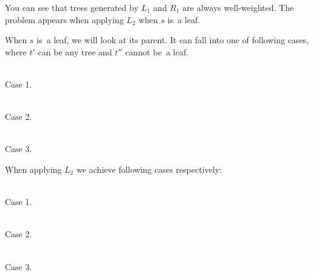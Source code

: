 \documentclass[final]{article}
\theoremstyle{definition}
\theoremstyle{definition}
\theoremstyle{remark}
\begin{document}
You can see that trees generated by \(L_1\) and \(R_1\) are always well-weighted. The problem appears when applying \(L_2\) when \(s\) is~a leaf.

When \(s\) is~a leaf, we will look at its parent. It can fall into one of following cases, where \(t'\) can be any tree and \(t''\) cannot be~a leaf.

\begin{center}
    \begin{minipage}[t]{.3\textwidth}
        \begin{center}
            \\
            Case 1.
        \end{center}
    \end{minipage}%
    \begin{minipage}[t]{.3\textwidth}
        \begin{center}
            \\
            Case 2.
        \end{center}
    \end{minipage}%
    \begin{minipage}[t]{.3\textwidth}
        \begin{center}
            \\
            Case 3.
        \end{center}
    \end{minipage}%
\end{center}

When applying \(L_2\) we achieve following cases respectively:

\begin{center}
    \begin{minipage}[t]{.3\textwidth}
        \begin{center}
            \\
            Case 1.
        \end{center}
    \end{minipage}%
    \begin{minipage}[t]{.3\textwidth}
        \begin{center}
            \\
            Case 2.
        \end{center}
    \end{minipage}%
    \begin{minipage}[t]{.3\textwidth}
        \begin{center}
            \\
            Case 3.
        \end{center}
    \end{minipage}%
\end{center}
\end{document}
